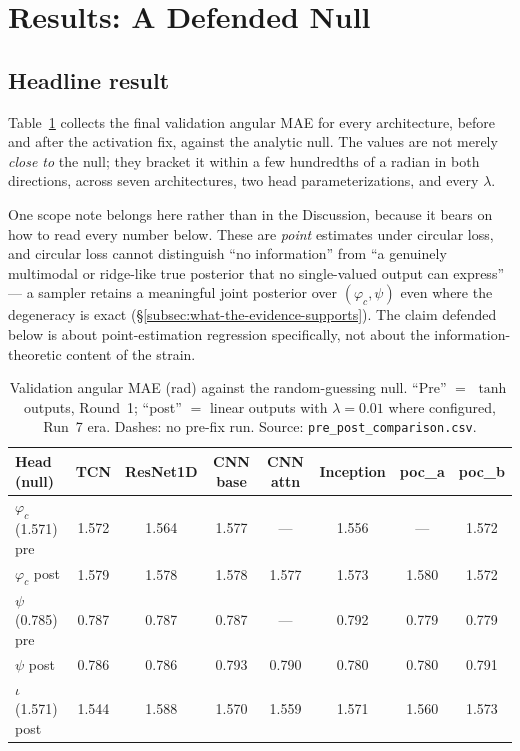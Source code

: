 \documentclass[11pt]{article}
\begin{document}
\section{Results: A Defended Null}
\label{sec:phicpsi:results}

\subsection{Headline result}
\label{subsec:headline-result}

Table~\ref{tab:phicpsi:prepost} collects the final validation angular MAE for every architecture, before and after the activation fix, against the analytic null.
The values are not merely \emph{close to} the null; they bracket it within a few hundredths of a radian in both directions, across seven architectures, two head parameterizations, and every $\lambda$.

One scope note belongs here rather than in the Discussion, because it bears on how to read every number below.
These are \emph{point} estimates under circular loss, and circular loss cannot distinguish ``no information'' from ``a genuinely multimodal or ridge-like true posterior that no single-valued output can express'' --- a sampler retains a meaningful joint posterior over $(\varphi_c, \psi)$ even where the degeneracy is exact (\S\ref{subsec:what-the-evidence-supports}).
The claim defended below is about point-estimation regression specifically, not about the information-theoretic content of the strain.

\begin{table}[tbp]
    \centering
    \caption{Validation angular MAE (rad) against the random-guessing
    null. ``Pre'' $=$ $\tanh$ outputs, Round~1; ``post'' $=$ linear
    outputs with $\lambda = 0.01$ where configured, Run~7 era. Dashes: no
    pre-fix run. Source: \texttt{pre\_post\_comparison.csv}.}
    \label{tab:phicpsi:prepost}
    \small
    \begin{tabular}{@{}lccccccc@{}}
        \toprule
        Head (null)             & TCN   & ResNet1D & CNN base & CNN attn & Inception & poc\_a & poc\_b \\
        \midrule
        $\varphi_c$ (1.571) pre & 1.572 & 1.564    & 1.577    & ---      & 1.556     & ---    & 1.572  \\
        $\varphi_c$ post        & 1.579 & 1.578    & 1.578    & 1.577    & 1.573     & 1.580  & 1.572  \\
        $\psi$ (0.785) pre      & 0.787 & 0.787    & 0.787    & ---      & 0.792     & 0.779  & 0.779  \\
        $\psi$ post             & 0.786 & 0.786    & 0.793    & 0.790    & 0.780     & 0.780  & 0.791  \\
        $\iota$ (1.571) post    & 1.544 & 1.588    & 1.570    & 1.559    & 1.571     & 1.560  & 1.573  \\
        \bottomrule
    \end{tabular}
\end{table}
\end{document}
